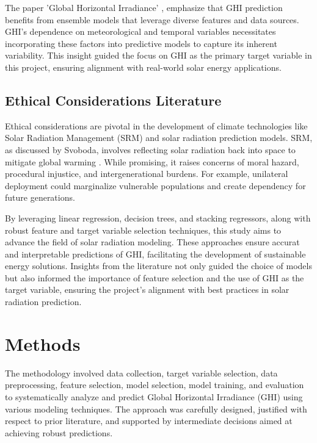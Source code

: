 \documentclass[10pt,twocolumn]{article}
\begin{document}
\begin{itemize}
The paper 'Global Horizontal Irradiance' \cite{8}, emphasize that GHI prediction benefits from ensemble models that leverage diverse features and data sources. GHI's dependence on meteorological and temporal variables necessitates incorporating these factors into predictive models to capture its inherent variability. This insight guided the focus on GHI as the primary target variable in this project, ensuring alignment with real-world solar energy applications.
\subsection{Ethical Considerations Literature}

Ethical considerations are pivotal in the development of climate technologies like Solar Radiation Management (SRM) and solar radiation prediction models. SRM, as discussed by Svoboda, involves reflecting solar radiation back into space to mitigate global warming \cite{11}. While promising, it raises concerns of moral hazard, procedural injustice, and intergenerational burdens. For example, unilateral deployment could marginalize vulnerable populations and create dependency for future generations.




By leveraging linear regression, decision trees, and stacking regressors, along with robust feature and target variable selection techniques, this study aims to advance the field of solar radiation modeling. These approaches ensure accurat and interpretable  predictions of GHI, facilitating the development of sustainable energy solutions. Insights from the literature not only guided the choice of models but also informed the importance of feature selection and the use of GHI as the target variable, ensuring the project's alignment with best practices in solar radiation prediction.






\section{Methods}

The methodology involved data collection, target variable selection, data preprocessing, feature selection, model selection, model training, and evaluation to systematically analyze and predict Global Horizontal Irradiance (GHI) using various modeling techniques. The approach was carefully designed, justified with respect to prior literature, and supported by intermediate decisions aimed at achieving robust predictions.


\end{itemize}
\end{document}
